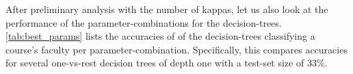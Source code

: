 After preliminary analysis with the number of kappas, let us also look at the performance of the parameter-combinations for the decision-trees. \autoref{tab:best_params} lists the accuracies of of the decision-trees classifying a course's faculty per parameter-combination. Specifically, this compares accuracies for several one-vs-rest decision trees of depth one with a test-set size of 33\%.


\newcommand{\SmfauhcsdT}{\setlength\extrarowheight{-5pt} \scriptsize \mfauhcsdT}
\newcommand{\Smfauhtcsldp}{\setlength\extrarowheight{-5pt} \scriptsize \mfauhtcsldp}

